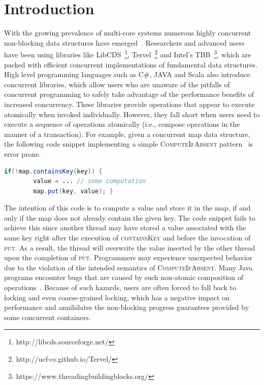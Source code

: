 \documentclass[]{sig-alternate-05-2015}
\begin{document}
\section{Introduction}
\label{sec:intro}
With the growing prevalence of multi-core systems numerous highly concurrent non-blocking data structures have emerged~\cite{linden2013skiplist,ellen2010non,braginsky2012lock,zhang2015lockfree,michael2002high}.
Researchers and advanced users have been using libraries like LibCDS~\footnote{http://libcds.sourceforge.net/}, Tervel~\footnote{http://ucf-cs.github.io/Tervel/} and Intel's TBB~\footnote{https://www.threadingbuildingblocks.org/}, which are packed with efficient concurrent implementations of fundamental data structures.
High level programming languages such as C\#, JAVA and Scala also introduce concurrent libraries, which allow users who are unaware of the pitfalls of concurrent programming to safely take advantage of the performance benefits of increased concurrency.
These libraries provide operations that appear to execute atomically when invoked individually.
However, they fall short when users need to execute a sequence of operations atomically (i.e., compose operations in the manner of a transaction).
For example, given a concurrent map data structure, the following code snippet implementing a simple \textsc{ComputeIfAbsent} pattern~\cite{golan2013concurrent} is error prone.
\begin{lstlisting}[basicstyle=\small,language=JAVA]
    if(!map.containsKey(key)) {
        value = ... // some computation
        map.put(key, value); }
\end{lstlisting}
The intention of this code is to compute a value and store it in the map, if and only if the map does not already contain the given key.
The code snippet fails to achieve this since another thread may have stored a value associated with the same key right after the execution of \textsc{containsKey} and before the invocation of \textsc{put}.
As a result, the thread will overwrite the value inserted by the other thread upon the completion of \textsc{put}.
Programmers may experience unexpected behavior due to the violation of the intended semantics of \textsc{ComputeIfAbsent}.
Many Java programs encounter bugs that are caused by such non-atomic composition of operations~\cite{shacham2011testing}.
Because of such hazards, users are often forced to fall back to locking and even coarse-grained locking, which has a negative impact on performance and annihilates the non-blocking progress guarantees provided by some concurrent containers.
\end{document}
